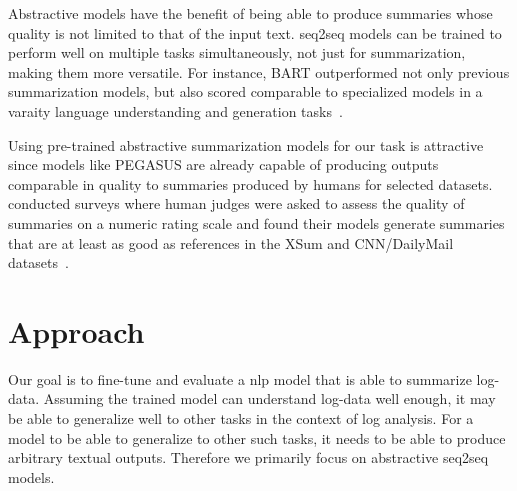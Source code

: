 Abstractive models have the benefit of being able to produce summaries whose quality is not limited to that of the input text.
\Acl{seq2seq} models can be trained to perform well on multiple tasks simultaneously,
not just for summarization, making them more versatile.
For instance, BART outperformed not only previous summarization models,
but also scored comparable to specialized models in a varaity language understanding and generation tasks~\parencite[7876-7877]{bart}.

Using pre-trained abstractive summarization models for our task is attractive
since models like PEGASUS are already capable of producing outputs comparable in quality to summaries produced by humans for selected datasets.
\citeauthor*{pegasus} conducted surveys where human judges were asked to assess the quality of summaries on a numeric rating scale
and found their models generate summaries that are at least as good as references in the XSum and CNN/DailyMail datasets~\parencite[11335]{pegasus}.

\section{Approach}\label{sec:approach}


Our goal is to fine-tune and evaluate a \ac{nlp} model that is able to summarize log-data.
Assuming the trained model can understand log-data well enough,
it may be able to generalize well to other tasks in the context of log analysis.
For a model to be able to generalize to other such tasks,
it needs to be able to produce arbitrary textual outputs.
Therefore we primarily focus on abstractive \acl{seq2seq} models.

